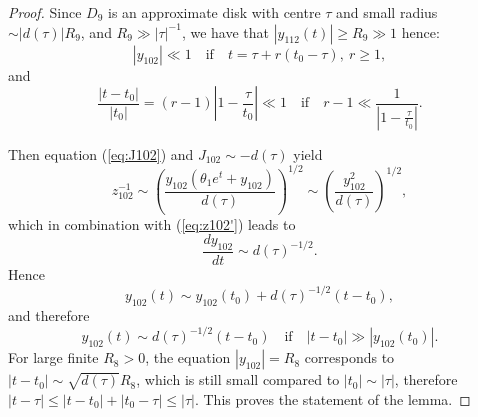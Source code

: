 \begin{proof}
Since $D_9$ is an approximate disk with centre $\tau$ and small radius $\sim|d(\tau)|R_9$, and $R_9\gg|\tau|^{-1}$, we have that
$|y_{112}(t)|\ge R_9\gg 1$ hence:
$$
|y_{102}|\ll1
\quad\text{if}\quad
t=\tau+r(t_0-\tau),
\ r\ge1,
$$
and
$$
\frac{|t-t_0|}{|t_0|}=(r-1)\left|1-\frac{\tau}{t_0}\right|\ll1
\quad\text{if}\quad
r-1\ll\frac{1}{|1-\frac{\tau}{t_0}|}.
$$

Then equation (\ref{eq:J102}) and $J_{102}\sim-d(\tau)$ yield
$$
z_{102}^{-1}
\sim
\left(\frac{y_{102}(\theta_1e^t+y_{102})}{d(\tau)}\right)^{1/2}
\sim
\left(\frac{y_{102}^2}{d(\tau)}\right)^{1/2},
$$
which in combination with (\ref{eq:z102'}) leads to
$$
\frac{d y_{102}}{dt}\sim d(\tau)^{-1/2}.
$$
Hence
$$
y_{102}(t)\sim y_{102}(t_0)+d(\tau)^{-1/2}(t-t_0),
$$
and therefore
$$
y_{102}(t) \sim d(\tau)^{-1/2}(t-t_0)
\quad\text{if}\quad
|t-t_0|\gg|y_{102}(t_0)|.
$$
For large finite $R_8>0$, the equation $|y_{102}|=R_8$ corresponds to $|t-t_0|\sim\sqrt{d(\tau)}R_8$, which is still small compared to 
$|t_0|\sim|\tau|$, therefore $|t-\tau|\le|t-t_0|+|t_0-\tau|\le|\tau|$.
This proves the statement of the lemma.
\end{proof}

